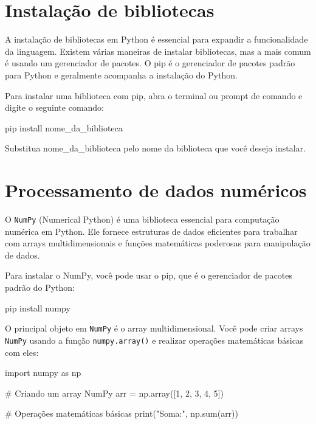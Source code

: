 \documentclass[
  portuguese,
  letterpaper,
  DIV=11,
  numbers=noendperiod]{scrreprt}
\newenvironment{Shaded}{\begin{snugshade}}{\end{snugshade}}
\newcommand{\BuiltInTok}[1]{\textcolor[rgb]{0.00,0.23,0.31}{#1}}
\newcommand{\CommentTok}[1]{\textcolor[rgb]{0.37,0.37,0.37}{#1}}
\newcommand{\DecValTok}[1]{\textcolor[rgb]{0.68,0.00,0.00}{#1}}
\newcommand{\ImportTok}[1]{\textcolor[rgb]{0.00,0.46,0.62}{#1}}
\newcommand{\NormalTok}[1]{\textcolor[rgb]{0.00,0.23,0.31}{#1}}
\newcommand{\OperatorTok}[1]{\textcolor[rgb]{0.37,0.37,0.37}{#1}}
\newcommand{\StringTok}[1]{\textcolor[rgb]{0.13,0.47,0.30}{#1}}
\theoremstyle{definition}
\theoremstyle{remark}
\begin{document}
\section{Instalação de
bibliotecas}\label{instalauxe7uxe3o-de-bibliotecas}

A instalação de bibliotecas em Python é essencial para expandir a
funcionalidade da linguagem. Existem várias maneiras de instalar
bibliotecas, mas a mais comum é usando um gerenciador de pacotes. O pip
é o gerenciador de pacotes padrão para Python e geralmente acompanha a
instalação do Python.

Para instalar uma biblioteca com pip, abra o terminal ou prompt de
comando e digite o seguinte comando:

\begin{Shaded}
\begin{Highlighting}[]
\NormalTok{pip install nome\_da\_biblioteca}
\end{Highlighting}
\end{Shaded}

Substitua nome\_da\_biblioteca pelo nome da biblioteca que você deseja
instalar.

\section{Processamento de dados
numéricos}\label{processamento-de-dados-numuxe9ricos}

O \texttt{NumPy} (Numerical Python) é uma biblioteca essencial para
computação numérica em Python. Ele fornece estruturas de dados
eficientes para trabalhar com arrays multidimensionais e funções
matemáticas poderosas para manipulação de dados.

Para instalar o NumPy, você pode usar o pip, que é o gerenciador de
pacotes padrão do Python:

\begin{Shaded}
\begin{Highlighting}[]
\NormalTok{pip install numpy}
\end{Highlighting}
\end{Shaded}

O principal objeto em \texttt{NumPy} é o array multidimensional. Você
pode criar arrays \texttt{NumPy} usando a função \texttt{numpy.array()}
e realizar operações matemáticas básicas com eles:

\begin{Shaded}
\begin{Highlighting}[]
\ImportTok{import}\NormalTok{ numpy }\ImportTok{as}\NormalTok{ np}

\CommentTok{\# Criando um array NumPy}
\NormalTok{arr }\OperatorTok{=}\NormalTok{ np.array([}\DecValTok{1}\NormalTok{, }\DecValTok{2}\NormalTok{, }\DecValTok{3}\NormalTok{, }\DecValTok{4}\NormalTok{, }\DecValTok{5}\NormalTok{])}

\CommentTok{\# Operações matemáticas básicas}
\BuiltInTok{print}\NormalTok{(}\StringTok{"Soma:"}\NormalTok{, np.}\BuiltInTok{sum}\NormalTok{(arr))}
\end{Highlighting}
\end{Shaded}
\end{document}
